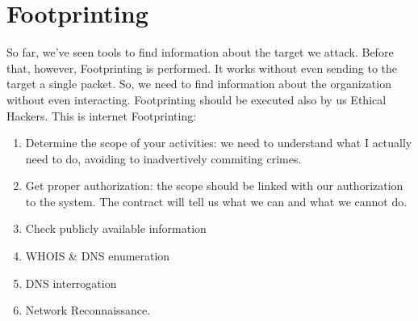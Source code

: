 \section{Footprinting}
So far, we've seen tools to find information about the 
target we attack. Before that, however, Footprinting is 
performed. It works without even sending to the target a 
single packet. So, we need to find information about the 
organization without even interacting. 
Footprinting should be executed also by us Ethical Hackers. 
This is internet Footprinting:
\begin{enumerate}
    \item Determine the scope of your activities: we need to 
    understand what I actually need to do, avoiding to 
    inadvertively commiting crimes. 
    \item Get proper authorization: the scope should be 
    linked with our authorization to the system. The contract 
    will tell us what we can and what we cannot do. 
    \item Check publicly available information
    \item WHOIS \& DNS enumeration 
    \item DNS interrogation 
    \item Network Reconnaissance.
\end{enumerate}


